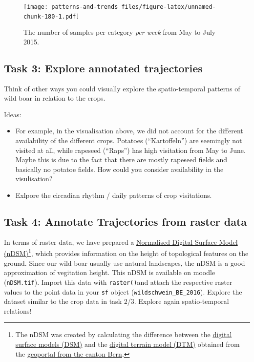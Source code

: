 \documentclass[]{book}
\providecommand{\tightlist}{%
  \setlength{\itemsep}{0pt}\setlength{\parskip}{0pt}}
\let\rmarkdownfootnote\footnote%
\def\footnote{\protect\rmarkdownfootnote}
\begin{document}
\begin{figure}
\centering
\texttt{[image: patterns-and-trends\_files/figure-latex/unnamed-chunk-180-1.pdf]}
\caption{\label{fig:unnamed-chunk-180}The number of samples per category \emph{per week} from May to July 2015.}
\end{figure}

\hypertarget{task-3-explore-annotated-trajectories}{%
\subsection{Task 3: Explore annotated trajectories}\label{task-3-explore-annotated-trajectories}}

Think of other ways you could visually explore the spatio-temporal patterns of wild boar in relation to the crops.

Ideas:

\begin{itemize}
\tightlist
\item
  For example, in the visualisation above, we did not account for the different availability of the different crops. Potatoes (``Kartoffeln'') are seemingly not visited at all, while rapeseed (``Raps'') has high visitation from May to June. Maybe this is due to the fact that there are mostly rapeseed fields and basically no potatoe fields. How could you consider availability in the visulisation?
\item
  Exlpore the circadian rhythm / daily patterns of crop visitations.
\end{itemize}

\hypertarget{task-4-annotate-trajectories-from-raster-data}{%
\subsection{Task 4: Annotate Trajectories from raster data}\label{task-4-annotate-trajectories-from-raster-data}}

In terms of raster data, we have prepared a \href{https://gisgeography.com/lidar-light-detection-and-ranging/}{Normalised Digital Surface Model (nDSM)}\footnote{The nDSM was created by calculating the difference between the \href{https://www.geo.apps.be.ch/de/geodaten/suche-nach-geodaten.html?view=sheet\&guid=094ce943-6ad7-4f07-aa9f-d8eb17c5cb38\&catalog=geocatalog\&type=complete\&preview=search_list}{digital surface models (DSM)} and the \href{https://www.geo.apps.be.ch/de/geodaten/suche-nach-geodaten.html?view=sheet\&guid=490de97b-8932-4ef7-9d13-e89ef41eeb4b\&catalog=geocatalog\&type=complete\&preview=search_list}{digital terrain model (DTM)} obtained from the \href{https://www.geo.apps.be.ch/de/geodaten/suche-nach-geodaten.html}{geoportal from the canton Bern}. }, which provides information on the height of topological features on the ground. Since our wild boar usually use natural landscapes, the nDSM is a good approximation of vegitation height. This nDSM is available on moodle (\texttt{nDSM.tif}). Import this data with \texttt{raster()}and attach the respective raster values to the point data in your \texttt{sf} object (\texttt{wildschwein\_BE\_2016}). Explore the dataset similar to the crop data in task 2/3. Explore again spatio-temporal relations!
\end{document}
